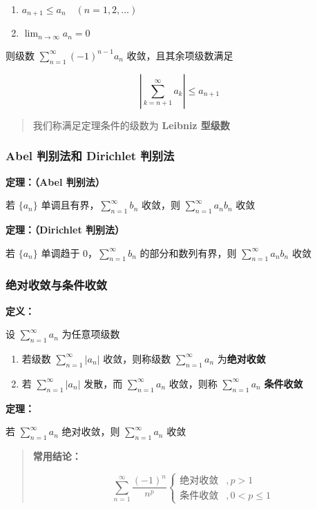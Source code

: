 \documentclass[lang = zh , final , oneside , openany , titlepage , zihao = -4 , linespread = 1.3 , baselineskip = false , cjk-font = windows , text-font = newtx , math-font = newtx]{sjtureport}
\begin{document}
\begin{enumerate}
    \item \(a_{n + 1} \leq a_n \quad \left(n = 1,2,\ldots\right)\)
    \item \(\lim_{n\to\infty}a_n = 0\)
\end{enumerate}

则级数 \(\sum_{n = 1}^\infty (-1)^{n - 1}a_n\) 收敛，且其余项级数满足

\[
\left\vert \sum_{k = n + 1}^\infty a_k \right\vert \leq a_{n + 1}
\]

\begin{quote}
我们称满足定理条件的级数为 \textbf{Leibniz 型级数}
\end{quote}

\subsubsection{Abel 判别法和 Dirichlet 判别法}

\textbf{定理：（Abel 判别法）}

若 \(\{a_n\}\) 单调且有界，\(\sum_{n = 1}^\infty b_n\) 收敛，则 \(\sum_{n = 1}^\infty a_nb_n\) 收敛

\textbf{定理：（Dirichlet 判别法）}

若 \(\{a_n\}\) 单调趋于 \(0\)，\(\sum_{n = 1}^\infty b_n\) 的部分和数列有界，则 \(\sum_{n = 1}^\infty a_nb_n\) 收敛

\subsubsection{绝对收敛与条件收敛}

\textbf{定义：}

设 \(\sum_{n = 1}^\infty a_n\) 为任意项级数

\begin{enumerate}
    \item 若级数 \(\sum_{n = 1}^\infty \vert a_n \vert\) 收敛，则称级数 \(\sum_{n = 1}^\infty a_n\) 为\textbf{绝对收敛}
    \item 若 \(\sum_{n = 1}^\infty \vert a_n \vert\) 发散，而 \(\sum_{n = 1}^\infty a_n\) 收敛，则称 \(\sum_{n = 1}^\infty a_n\) \textbf{条件收敛}
\end{enumerate}

\textbf{定理：}

若 \(\sum_{n = 1}^\infty a_n\) 绝对收敛，则 \(\sum_{n = 1}^\infty a_n\) 收敛

\begin{quote}
\textbf{常用结论：}

\[
\sum_{n = 1}^\infty \frac{(-1)^{n}}{n^p}\begin{cases}\text{绝对收敛} & ,p > 1\\ \text{条件收敛} & , 0 < p \leq 1 \end{cases}
\]
\end{quote}
\end{document}
